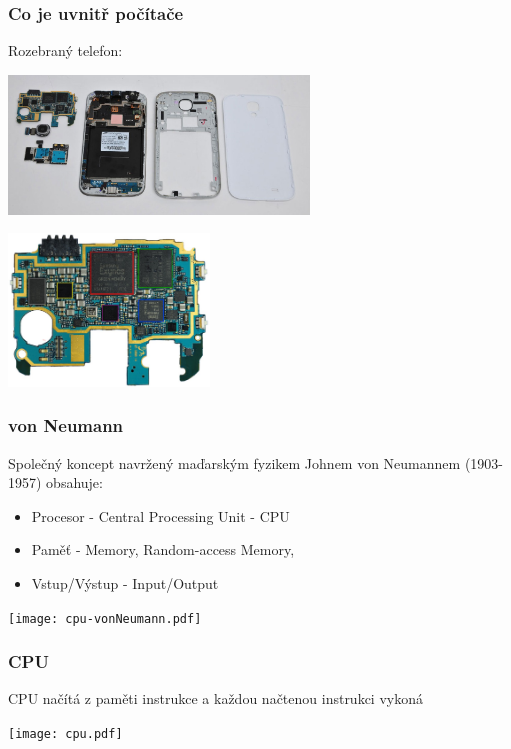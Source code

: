 \documentclass{beamer}
\begin{document}
\begin{frame}
\frametitle{Co je uvnitř počítače}

Rozebraný telefon:
\begin{center}
   \includegraphics[width=0.6\textwidth]{fig/mobile.jpg}
\end{center}
\begin{center}
   \includegraphics[width=0.4\textwidth]{fig/mobile-cpu.jpg}
\end{center}
\end{frame}


\begin{frame}
\frametitle{von Neumann}

Společný koncept navržený maďarským fyzikem Johnem von Neumannem (1903-1957) obsahuje:
\begin{itemize}
\item Procesor - Central Processing Unit - CPU
\item Paměť - Memory, Random-access Memory, 
\item Vstup/Výstup - Input/Output
\end{itemize}
\begin{center}
   \texttt{[image: cpu-vonNeumann.pdf]}
\end{center}

\end{frame}


\begin{frame}
\frametitle{CPU}

CPU načítá z paměti instrukce a každou načtenou instrukci vykoná
\begin{center}
   \texttt{[image: cpu.pdf]}
\end{center}

\end{frame}
\end{document}
